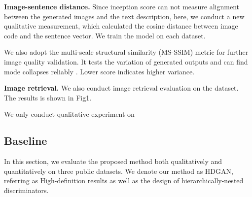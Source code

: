 \documentclass[10pt,twocolumn,letterpaper]{article}
\begin{document}
\textbf{Image-sentence distance. } Since inception score can not measure alignment between the generated images and the text description, here, we conduct a new qualitative measurement, which calculated the cosine distance between image code and the sentence vector. We train the model on each dataset.

We also adopt the multi-scale structural similarity (MS-SSIM) metric \cite{improvedGAN} for further image quality validation. It tests the variation of generated outputs and can find mode collapses reliably \cite{odena2016conditional}. Lower score indicates higher variance.

\textbf{Image retrieval. } We also conduct image retrieval evaluation on the dataset. The results is shown in Fig1.

We only conduct qualitative experiment on 

\subsection{Baseline}

In this section, we evaluate the proposed method both qualitatively and quantitatively on three public datasets. We denote our method as HDGAN, referring as High-definition results as well as the design of hierarchically-nested discriminators.


\end{document}
